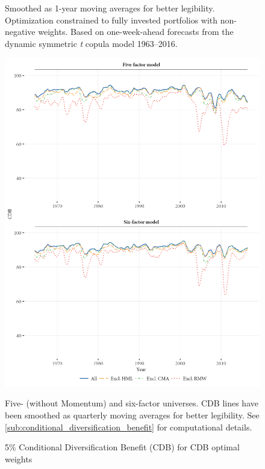 \begin{figure}[p]
  \begin{longcaption}
    Smoothed as 1-year moving averages for better legibility. Optimization constrained to fully invested portfolios with non-negative weights. Based on one-week-ahead forecasts from the dynamic symmetric \emph{t} copula model 1963--2016.
  \end{longcaption}
\end{figure}

\begin{figure}[p]
  \centering
  \footnotesize
  \includegraphics[width = \textwidth]{graphics/cdb/CDB.png}
  \caption{5\% Conditional Diversification Benefit (CDB) for CDB optimal weights}

  \begin{longcaption}
    Five- (without Momentum) and six-factor universes. CDB lines have been smoothed as quarterly moving averages for better legibility. See \autoref{sub:conditional_diversification_benefit} for computational details.
  \end{longcaption}
  \label{fig:cdb_cdb}
\end{figure}

